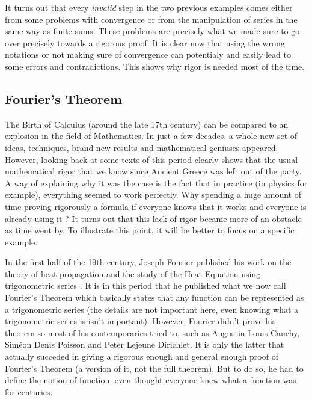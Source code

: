 \documentclass[12pt]{article}
\theoremstyle{definition}
\newcounter{prop}[section]
\begin{document}
It turns out that every \textit{invalid} step in the two previous examples comes either from some problems with convergence or from the manipulation of series in the same way as finite sums. These problems are precisely what we made sure to go over precisely towards a rigorous proof. It is clear now that using the wrong notations or not making sure of convergence can potentialy and easily lead to some errors and contradictions. This shows why rigor is needed most of the time.

\subsection{Fourier's Theorem}

The Birth of Calculus (around the late 17th century) can be compared to an explosion in the field of Mathematics. In just a few decades, a whole new set of ideas, techniques, brand new results and mathematical geniuses appeared. However, looking back at some texts of this period clearly shows that the usual mathematical rigor that we know since Ancient Greece was left out of the party. A way of explaining why it was the case is the fact that in practice (in physics for example), everything seemed to work perfectly. Why spending a huge amount of time proving rigorously a formula if everyone knows that it works and everyone is already using it ? It turns out that this lack of rigor became more of an obstacle as time went by. To illustrate this point, it will be better to focus on a specific example.


In the first half of the 19th century, Joseph Fourier published his work on the theory of heat propagation and the study of the Heat Equation using trigonometric series \cite{fourier1822}. It is in this period that he published what we now call Fourier's Theorem which basically states that any function can be represented as a trigonometric series (the details are not important here, even knowing what a trigonometric series is isn't important). However, Fourier didn't prove his theorem so most of his contemporaries tried to, such as Augustin Louis Cauchy, Siméon Denis Poisson and Peter Lejeune Dirichlet. It is only the latter that actually succeded in giving a rigorous enough and general enough proof of Fourier's Theorem (a version of it, not the full theorem). But to do so, he had to define the notion of function, even thought everyone knew what a function was for centuries.
\end{document}

